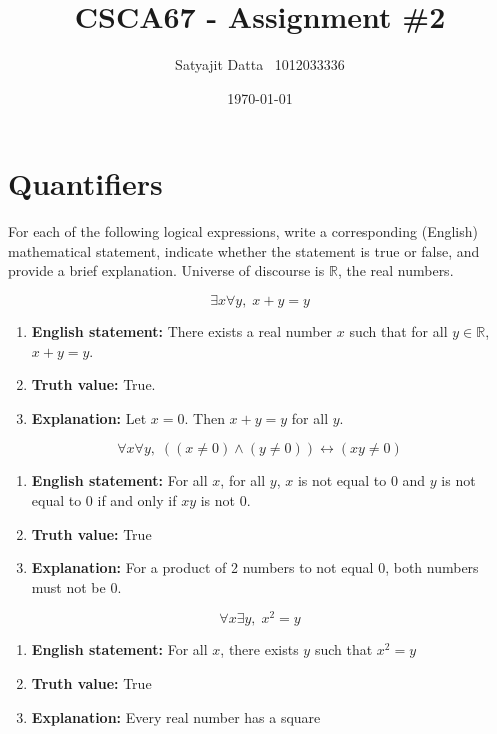 \documentclass[]{article}
\title{\textbf{CSCA67 - Assignment \#2}}
\author{Satyajit Datta \ 1012033336}
\date{\today}
\begin{document}
\maketitle

\section{Quantifiers}
For each of the following logical expressions, write a corresponding (English) mathematical statement, indicate
whether the statement is true or false, and provide a brief explanation. Universe of discourse is $\mathbb{R}$, the real numbers.

\begin{question}{1.1}
\[
\exists x \forall y,\; x + y = y
\]
\end{question}
\begin{enumerate}[label=(\alph*)]
    \item \textbf{English statement:} There exists a real number $x$ such that for all $y \in \mathbb{R}$, $x + y = y$.
    \item \textbf{Truth value:} True.
    \item \textbf{Explanation:} Let $x = 0$. Then $x + y = y$ for all $y$.
\end{enumerate}

\begin{question}{1.2}
\[
\forall x\forall y,\;((x \ne 0) \land (y \ne 0)) \leftrightarrow (xy \ne 0)
\]
\end{question}
\begin{enumerate}[label=(\alph*)]
    \item \textbf{English statement:} For all $x$, for all $y$, $x$ is not equal to $0$ and $y$ is not equal to $0$ if and only if $xy$ is not $0$.
    \item \textbf{Truth value:} True
    \item \textbf{Explanation:} For a product of 2 numbers to not equal 0, both numbers must not be 0.
\end{enumerate}

\begin{question}{1.3}
\[
\forall x\exists y,\; x^2 = y
\]
\end{question}
\begin{enumerate}[label=(\alph*)]
    \item \textbf{English statement:} For all $x$, there exists $y$ such that $x^2 = y$
    \item \textbf{Truth value:} True
    \item \textbf{Explanation:} Every real number has a square
\end{enumerate}
\end{document}
